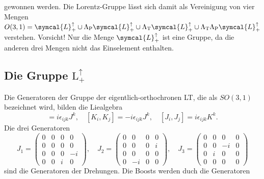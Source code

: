 \documentclass[
  captions=tableheading,  %
  titlepage=firstiscover, %
]{scrartcl}
\begin{document}
gewonnen werden.
Die Lorentz-Gruppe lässt sich damit als Vereinigung von vier Mengen 
$O(3,1) = \symcal{L}_+^{\uparrow} \cup \Lambda_{\text{P}} \symcal{L}_+^{\uparrow}\cup 
\Lambda_{\text{T}} \symcal{L}_+^{\uparrow}\cup\Lambda_{\text{T}} \Lambda_{\text{P}} \symcal{L}_+^{\uparrow}$ verstehen.
{\color{red} Vorsicht!} Nur die Menge $ \symcal{L}_+^{\uparrow}$ ist eine Gruppe, da die anderen drei Mengen nicht das Einselement enthalten.
\subsection{Die Gruppe \texorpdfstring{$\text{L}_+^{\uparrow}$}{PDFstring} }
\label{sub:l+arr}
Die Generatoren der Gruppe der eigentlich-orthochronen LT, die als 
$SO(3,1)$ bezeichnet wird, bilden die Liealgebra 
\begin{equation}
  [J_i,J_j] = i \epsilon_{ijk} J^k,\quad [K_i, K_j] = - i \epsilon_{ijk} J^k,
  \quad [J_i,J_j] = i \epsilon_{ijk} K^k. \label{eqn:genspinor}
\end{equation}
Die drei Generatoren 
\begin{equation*}
  J_1 = 
  \begin{pmatrix}
    0 & 0   & 0   & 0 \\
    0 & 0   & 0   & 0 \\
    0 & 0   & 0   & -i \\
    0 & 0   & i   & 0  
  \end{pmatrix}, \quad
  J_2 = 
  \begin{pmatrix}
    0 & 0 & 0 & 0 \\
    0 & 0 & 0 & i \\
    0 & 0 & 0 & 0 \\
    0 & -i& 0 & 0 
  \end{pmatrix}, \quad 
  J_3 = 
  \begin{pmatrix}
    0 & 0 & 0 & 0 \\
    0 & 0 & -i& 0 \\
    0 & i & 0 & 0 \\
    0 & 0 & 0 & 0 
  \end{pmatrix}
\end{equation*}
sind die Generatoren der Drehungen.
Die Boosts werden duch die Generatoren
\end{document}
